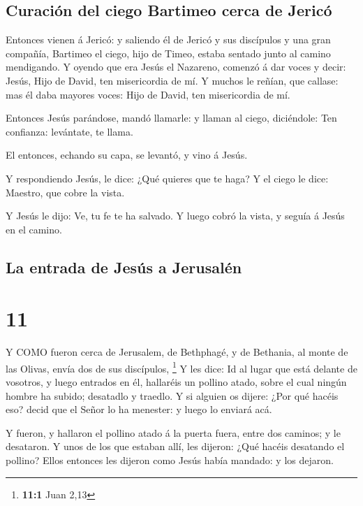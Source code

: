 \hypertarget{curaciuxf3n-del-ciego-bartimeo-cerca-de-jericuxf3}{%
\subsection{Curación del ciego Bartimeo cerca de
Jericó}\label{curaciuxf3n-del-ciego-bartimeo-cerca-de-jericuxf3}}

 Entonces vienen á Jericó: y saliendo él de Jericó y sus
discípulos y una gran compañía, Bartimeo el ciego, hijo de Timeo, estaba
sentado junto al camino mendigando.  Y oyendo que era Jesús
el Nazareno, comenzó á dar voces y decir: Jesús, Hijo de David, ten
misericordia de mí.  Y muchos le reñían, que callase: mas
él daba mayores voces: Hijo de David, ten misericordia de mí.

 Entonces Jesús parándose, mandó llamarle: y llaman al
ciego, diciéndole: Ten confianza: levántate, te llama.

 El entonces, echando su capa, se levantó, y vino á Jesús.

 Y respondiendo Jesús, le dice: ¿Qué quieres que te haga? Y
el ciego le dice: Maestro, que cobre la vista.

 Y Jesús le dijo: Ve, tu fe te ha salvado. Y luego cobró la
vista, y seguía á Jesús en el camino.

\hypertarget{la-entrada-de-jesuxfas-a-jerusaluxe9n}{%
\subsection{La entrada de Jesús a
Jerusalén}\label{la-entrada-de-jesuxfas-a-jerusaluxe9n}}

\hypertarget{section-10}{%
\section{11}\label{section-10}}

 Y COMO fueron cerca de Jerusalem, de Bethphagé, y de
Bethania, al monte de las Olivas, envía dos de sus discípulos,
\footnote{\textbf{11:1} Juan 2,13}  Y les dice: Id al lugar
que está delante de vosotros, y luego entrados en él, hallaréis un
pollino atado, sobre el cual ningún hombre ha subido; desatadlo y
traedlo.  Y si alguien os dijere: ¿Por qué hacéis eso? decid
que el Señor lo ha menester: y luego lo enviará acá.

 Y fueron, y hallaron el pollino atado á la puerta fuera,
entre dos caminos; y le desataron.  Y unos de los que
estaban allí, les dijeron: ¿Qué hacéis desatando el pollino?
 Ellos entonces les dijeron como Jesús había mandado: y los
dejaron.

